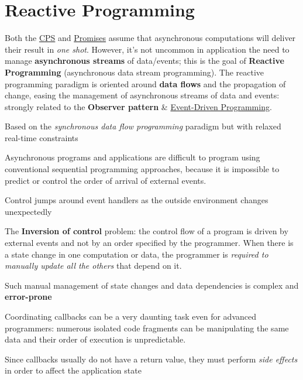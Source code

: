 \chapter{Reactive Programming}\label{chap:rp_reactive_programming} %
Both the \hyperref[def:cps]{CPS} and \hyperref[def:promises]{Promises} assume that asynchronous computations will deliver their result in \textit{one shot}.
However, it's not uncommon in application the need to manage \textbf{asynchronous streams} of data/events; this is the goal of \textbf{Reactive Programming} (asynchronous data stream programming).
\emptyln{}
The reactive programming paradigm is oriented around \textbf{data flows} and the propagation of change, easing the management of asynchronous streams of data and events: strongly related to the \textbf{Observer pattern} \& \hyperref[sec:rs_event_driven_programming]{Event-Driven Programming}.
\begin{note}[\ac{frp}]
    Based on the \textit{synchronous data flow programming} paradigm but with relaxed real-time constraints
\end{note}
Asynchronous programs and applications are difficult to program using conventional sequential programming approaches, because it is impossible to predict or control the order of arrival of external events.
\begin{note}
    Control jumps around event handlers as the outside environment changes unexpectedly
\end{note}
The \textbf{Inversion of control} problem: the control flow of a program is driven by external events and not by an order specified by the programmer.
When there is a state change in one computation or data, the programmer is \textit{required to manually update all the others} that depend on it.
\begin{warning}
    Such manual management of state changes and data dependencies is complex and \textbf{error-prone}
\end{warning}
Coordinating callbacks can be a very daunting task even for advanced programmers: numerous isolated code fragments can be manipulating the same data and their order of execution is unpredictable.
\begin{critical}
    Since callbacks usually do not have a return value, they must perform \textit{side effects} in order to affect the application state
\end{critical}
